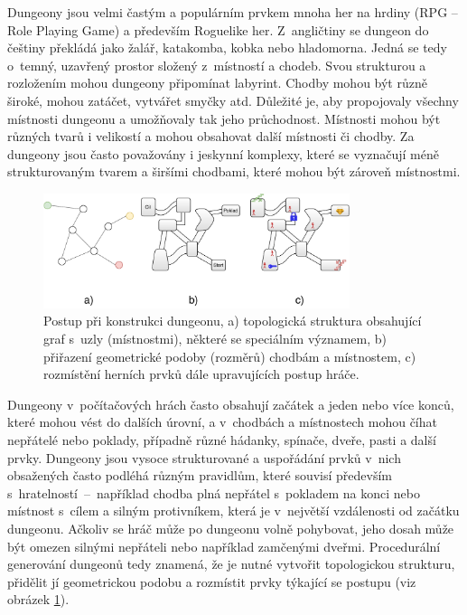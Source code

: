 
Dungeony jsou velmi častým a populárním prvkem mnoha her na hrdiny (RPG -- Role Playing Game) a především Roguelike her.
Z~angličtiny se dungeon do češtiny překládá jako žalář, katakomba, kobka nebo hladomorna.
Jedná se tedy o~temný, uzavřený prostor složený z~místností a chodeb.
Svou strukturou a rozložením mohou dungeony připomínat labyrint.
Chodby mohou být různě široké, mohou zatáčet, vytvářet smyčky atd.
Důležité je, aby propojovaly všechny místnosti dungeonu a umožňovaly tak jeho průchodnost.
Místnosti mohou být různých tvarů i velikostí a mohou obsahovat další místnosti či chodby.
Za dungeony jsou často považovány i jeskynní komplexy, které se vyznačují méně strukturovaným tvarem a širšími chodbami, které mohou být zároveň místnostmi.
\par
\begin{figure}[ht]
    \centering
    \includegraphics[width=0.8\textwidth]{obrazky/dung_topo_geom.pdf}
    \caption{Postup při konstrukci dungeonu, a) topologická struktura obsahující graf s~uzly (místnostmi), některé se speciálním významem, b) přiřazení geometrické podoby (rozměrů) chodbám a místnostem, c) rozmístění herních prvků dále upravujících postup hráče.}
    \label{img:dung_topo_geom}
\end{figure}
Dungeony v~počítačových hrách často obsahují začátek a jeden nebo více konců, které mohou vést do dalších úrovní, a v~chodbách a místnostech mohou číhat nepřátelé nebo poklady, případně různé hádanky, spínače, dveře, pasti a další prvky.
Dungeony jsou vysoce strukturované a uspořádání prvků v~nich obsažených často podléhá různým pravidlům, které souvisí především s~hratelností~--~například chodba plná nepřátel s~pokladem na konci nebo místnost s~cílem a silným protivníkem, která je v~největší vzdálenosti od začátku dungeonu.
Ačkoliv se hráč může po dungeonu volně pohybovat, jeho dosah může být omezen silnými nepřáteli nebo například zamčenými dveřmi.
Procedurální generování dungeonů tedy znamená, že je nutné vytvořit topologickou strukturu, přidělit jí geometrickou podobu a rozmístit prvky týkající se postupu (viz obrázek \ref{img:dung_topo_geom})\cite{lit:pcg_constructive_methods}.
